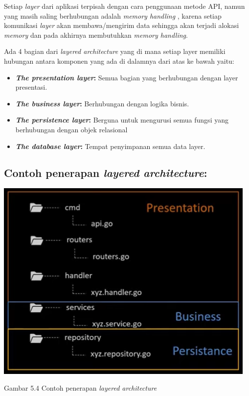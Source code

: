 Setiap \textit{layer} dari aplikasi terpisah dengan cara penggunaan metode API, namun yang masih saling berhubungan adalah \textit{memory handling} , karena setiap komunikasi \textit{layer} akan membawa/mengirim data sehingga akan terjadi alokasi \textit{memory} dan pada akhirnya membutuhkan \textit{memory handling}.

Ada 4 bagian dari \textit{layered architecture} yang di mana setiap layer memiliki hubungan antara komponen yang ada di dalamnya dari atas ke bawah yaitu:

\begin{itemize}
    \item \textbf{\textit{The presentation layer}:} Semua bagian yang berhubungan dengan layer presentasi.
    \item \textbf{\textit{The business layer}:} Berhubungan dengan logika bisnis.
    \item \textbf{\textit{The persistence layer}:} Berguna untuk mengurusi semua fungsi yang berhubungan dengan objek relasional
    \item \textbf{\textit{The database layer}:} Tempat penyimpanan semua data layer.
\end{itemize}

\subsection{Contoh penerapan \textit{layered architecture}:}

\includegraphics[width=\textwidth]{../images/contoh}
\begin{center}
	Gambar 5.4 Contoh penerapan \textit{layered architecture}
\end{center}

